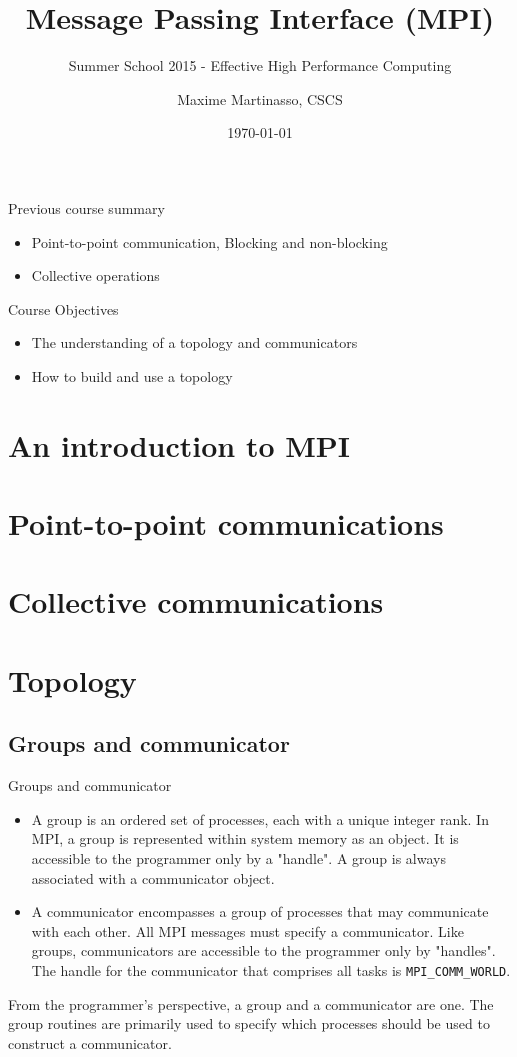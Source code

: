 \documentclass[aspectratio=43]{beamer}
\author{Maxime Martinasso, CSCS}
\title{Message Passing Interface (MPI)}
\subtitle{Summer School 2015 - Effective High Performance Computing}
\date{\today}
\begin{document}
\cscstitle

\begin{frame}{Previous course summary}
\begin{itemize}
\item Point-to-point communication, Blocking and non-blocking
\item Collective operations
\end{itemize}
\end{frame}

\begin{frame}{Course Objectives}
\begin{itemize}
\item The understanding of a topology and communicators
\item How to build and use a topology
\end{itemize}
\end{frame}


\section{An introduction to MPI}
\section{Point-to-point communications}
\section{Collective communications}
\section{Topology}


\subsection{Groups and communicator}

\begin{frame}[fragile]{Groups and communicator}
\begin{itemize}
\item A group is an ordered set of processes, each with a unique integer rank. In MPI, a group is represented within system memory as an object. It is accessible to the programmer only by a "handle". A group is always associated with a communicator object.
\item A communicator encompasses a group of processes that may communicate with each other. All MPI messages must specify a communicator. Like groups, communicators are accessible to the programmer only by "handles". The handle for the communicator that comprises all tasks is \verb+MPI_COMM_WORLD+.
\end{itemize}
From the programmer's perspective, a group and a communicator are
one. The group routines are primarily used to specify which
processes should be used to construct a communicator.
\end{frame}
\end{document}
